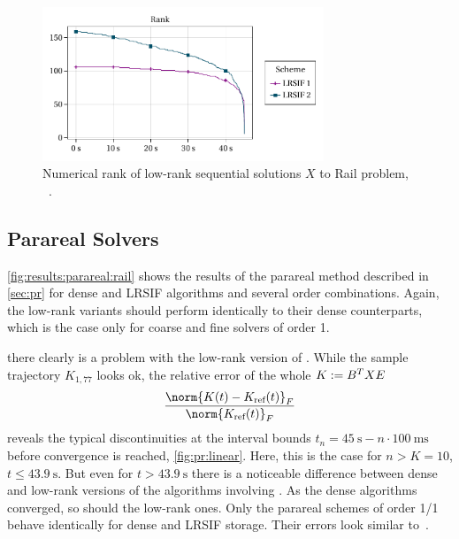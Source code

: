 \begin{figure}[tp]
  \centering
  \includegraphics[width=0.75\textwidth]{figures/fig_results_sequential_rank.pdf}
  \caption[Numerical rank of low-rank sequential solutions to Rail problem]{%
    Numerical rank of low-rank sequential solutions $X$ to Rail problem,
    \cf~\cite[Figure~6.6b]{Lang2017}.
  }
  \label{fig:results:sequential:rank}
\end{figure}

\subsection{Parareal Solvers}
\label{sec:results:parareal}

\autoref{fig:results:parareal:rail} shows the results of the parareal method described in \autoref{sec:pr}
for dense and \ac{LRSIF} algorithms and several order combinations.
Again, the low-rank variants should perform identically to their dense counterparts,
which is the case only for coarse and fine solvers of order 1.


there clearly is a problem with the low-rank version of .
While the sample trajectory $K_{1,77}$ looks ok,
the relative error of the whole $K := B^T X E$
\begin{equation}
  \frac{\norm{K(t) - K_\text{ref}(t)}_F}{\norm{K_\text{ref}(t)}_F}
\end{equation}
reveals the typical discontinuities at the interval bounds
$t_n = \SI{45}{\second} - n \cdot \SI{100}{\milli\second}$
before convergence is reached,
\cf \autoref{fig:pr:linear}.
Here, this is the case for $n > K = 10$, \ie $t \leq \SI{43.9}{\second}$.
But even for $t > \SI{43.9}{\second}$ there is a noticeable difference between
dense and low-rank versions of the algorithms involving .
As the dense algorithms converged, so should the low-rank ones.
Only the parareal schemes of order 1/1 behave identically for dense and \ac{LRSIF} storage.
Their errors look similar to~\cite[Fig.~1]{Lang2015}.


